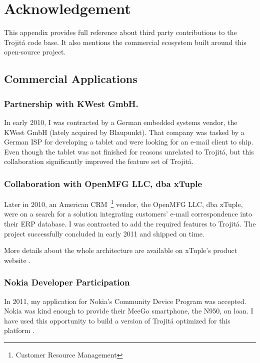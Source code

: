 \documentclass[trojita]{subfiles}
\begin{document}
\chapter{Acknowledgement}
\label{sec:acknowledgement}

This appendix provides full reference about third party contributions to the Trojitá code base.  It also mentions the
commercial ecosystem built around this open-source project.

\section{Commercial Applications}

\subsection{Partnership with KWest GmbH.}
\label{sec:kwest}

In early 2010, I was contracted \cite{kwest-trojita} by a German embedded systems vendor, the KWest GmbH (lately
acquired by Blaupunkt).  That company was tasked by a German ISP for developing a tablet and were looking for an e-mail
client to ship.  Even though the tablet was not finished for reasons unrelated to Trojitá, but this collaboration
significantly improved the feature set of Trojitá.

\subsection{Collaboration with OpenMFG LLC, dba xTuple}
\label{sec:xtuple}

Later in 2010, an American CRM~\footnote{Customer Resource Management} vendor, the OpenMFG LLC, dba xTuple, were on a
search for a solution integrating customers' e-mail correspondence into their ERP database.  I was contracted to add the
required features to Trojitá.  The project successfully concluded in early 2011 and shipped on time.

More details about the whole architecture are available on xTuple's product website \cite{xtuple-trojita}.

\subsection{Nokia Developer Participation}
\label{sec:nokia-cdp}

In 2011, my application for Nokia's Community Device Program was accepted.  Nokia was kind enough to provide their MeeGo
smartphone, the N950, on loan.  I have used this opportunity to build a version of Trojitá optimized for this platform
\cite{trojita-n950-preview}.
\end{document}
